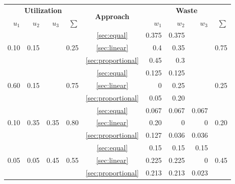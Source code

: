 \begin{table}
    \centering
    \begin{tabular}{|r|r|r|r|c|r|r|r|r|}
        \hline
        \multicolumn{4}{|c|}{\textbf{Utilization}} & \multirow{2}{*}{\textbf{Approach}} & \multicolumn{4}{|c|}{\textbf{Waste}} \\ 
        $u_1$ & $u_2$ & $u_3$ & $\sum$ & \multirow{2}{*}{} & $w_1$ & $w_2$ & $w_3$ & $\sum$ \\ \hline
        
        \multirow{3}{*}{0.10} & \multirow{3}{*}{0.15} &  & \multirow{3}{*}{0.25} 
        & \ref{sec:equal} & 0.375 & 0.375 & &                            \multirow{3}{*}{0.75} \\
        \multirow{3}{*}{}     & \multirow{3}{*}{}     & & \multirow{3}{*}{}
        & \ref{sec:linear} & 0.4 & 0.35 & & \multirow{3}{*}{} \\
        \multirow{3}{*}{}     & \multirow{3}{*}{}     & & \multirow{3}{*}{}
        & \ref{sec:proportional} & 0.45 & 0.3 & & \multirow{3}{*}{} \\ \hline
        
        \multirow{3}{*}{0.60} & \multirow{3}{*}{0.15} &  & \multirow{3}{*}{0.75} 
        & \ref{sec:equal} & 0.125 & 0.125 & &                            \multirow{3}{*}{0.25} \\
        \multirow{3}{*}{}     & \multirow{3}{*}{}     & & \multirow{3}{*}{}
        & \ref{sec:linear} & 0 & 0.25 & & \multirow{3}{*}{} \\
        \multirow{3}{*}{}     & \multirow{3}{*}{}     & & \multirow{3}{*}{}
        & \ref{sec:proportional} & 0.05 & 0.20 & & \multirow{3}{*}{} \\ \hline
        
        \multirow{3}{*}{0.10} & \multirow{3}{*}{0.35} & \multirow{3}{*}{0.35} & \multirow{3}{*}{0.80} 
        & \ref{sec:equal} & 0.067 & 0.067 & 0.067 & \multirow{3}{*}{0.20} \\
        \multirow{3}{*}{}     & \multirow{3}{*}{}     & \multirow{3}{*}{} & \multirow{3}{*}{}
        & \ref{sec:linear} & 0.20 & 0 & 0 & \multirow{3}{*}{} \\
        \multirow{3}{*}{}     & \multirow{3}{*}{}     & \multirow{3}{*}{} & \multirow{3}{*}{}
        & \ref{sec:proportional} & 0.127 & 0.036 & 0.036 & \multirow{3}{*}{} \\ \hline
        
        \multirow{3}{*}{0.05} & \multirow{3}{*}{0.05} & \multirow{3}{*}{0.45} & \multirow{3}{*}{0.55} 
        & \ref{sec:equal} & 0.15 & 0.15 & 0.15 & \multirow{3}{*}{0.45} \\
        \multirow{3}{*}{}     & \multirow{3}{*}{}     & \multirow{3}{*}{} & \multirow{3}{*}{}
        & \ref{sec:linear} & 0.225 & 0.225 & 0 & \multirow{3}{*}{} \\
        \multirow{3}{*}{}     & \multirow{3}{*}{}     & \multirow{3}{*}{} & \multirow{3}{*}{}
        & \ref{sec:proportional} & 0.213 & 0.213 & 0.023 & \multirow{3}{*}{} \\ \hline
        

\end{tabular}
\end{table}
